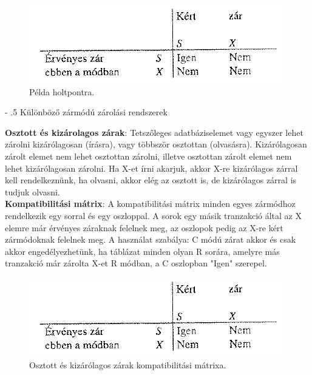 \documentclass[margin=0px]{article}
\makeatletter
\renewcommand\paragraph{%
	\@startsection{paragraph}{4}{0mm}%
	{-\baselineskip}%
	{.5\baselineskip}%
	{\normalfont\normalsize\bfseries}}
\makeatother
\begin{document}
	\begin{figure}[H]
		\centering
		\includegraphics[width=0.5\linewidth]{img/deadlock}
		\caption{Példa holtpontra.}
		\label{fig:deadlock}
	\end{figure}
	
	\paragraph{Különböző zármódú zárolási rendszerek}
	
	\noindent \textbf{Osztott és kizárolagos zárak}: Tetszőleges adatbáziselemet vagy egyszer lehet zárolni kizárólagosan (írásra), vagy
	többször osztottan (olvasásra). Kizárólagosan zárolt elemet nem lehet osztottan zárolni, illetve osztottan zárolt elemet
	nem lehet kizárólagosan zárolni. Ha X-et írni akarjuk, akkor X-re kizárólagos zárral kell rendelkeznünk, ha olvasni, akkor
	elég az osztott is, de kizárólagos zárral is tudjuk olvasni.\\
	
	\noindent \textbf{Kompatibilitási mátrix}: A kompatibilitási mátrix minden egyes zármódhoz rendelkezik egy sorral és egy oszloppal.
	A sorok egy másik tranzakció által az X elemre már érvényes záraknak felelnek meg, az oszlopok pedig az X-re kért zármódoknak
	felelnek meg. A használat szabálya: C módú zárat akkor és csak akkor engedélyezhetünk, ha táblázat minden olyan R sorára, amelyre
	más tranzakció már zárolta X-et R módban, a C oszlopban "Igen" szerepel.
	
	\begin{figure}[H]
		\centering
		\includegraphics[width=0.5\linewidth]{img/kompmatrix}
		\caption{Osztott és kizárólagos zárak kompatibilitási mátrixa.}
		\label{fig:kompmatrix}
	\end{figure}
	
\end{document}
